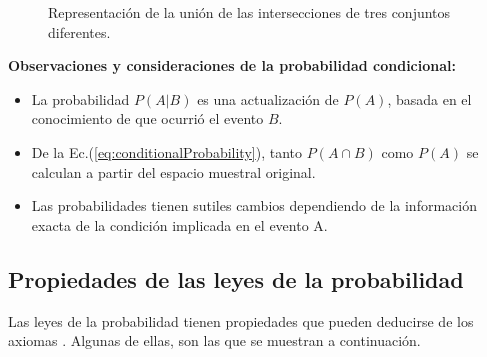 \begin{figure}[h]
    \centering
{}
\caption{Representación de la unión de las intersecciones de tres conjuntos diferentes.}
\label{fig:unionIntersection}
\end{figure}


\textbf{Observaciones y consideraciones de la probabilidad condicional:}

\begin{itemize}
\item La probabilidad $P(A|B)$ es una actualización de $P(A)$, basada en el
conocimiento de que ocurrió el evento $B$.

\item De la Ec.(\ref{eq:conditionalProbability}), tanto $P(A \cap B)$ como
$P(A)$ se calculan a partir del espacio muestral original.

\item Las probabilidades tienen sutiles cambios dependiendo de la información
exacta de la condición implicada en el evento A.
\end{itemize}

\subsection{Propiedades de las leyes de la probabilidad}

Las leyes de la probabilidad tienen propiedades que pueden deducirse de los
axiomas \cite{walpole2012probabilidad}. Algunas de ellas, son las que se muestran
a continuación.


